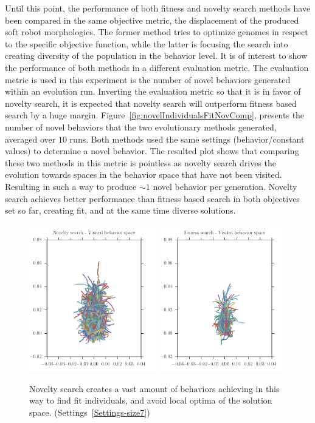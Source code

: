 Until this point, the performance of both fitness and novelty search methods have been compared in the same objective metric, the displacement of the produced soft robot morphologies. The former method tries to optimize genomes in respect to the specific objective function, while the latter is focusing the search into creating diversity of the population in the behavior level. It is of interest to show the performance of both methods in a different evaluation metric. The evaluation metric is used in this experiment is the number of novel behaviors generated within an evolution run. Inverting the evaluation metric so that it is in favor of novelty search, it is expected that novelty search will outperform fitness based search by a huge margin. Figure~\ref{fig:novelIndividualsFitNovComp}, presents the number of novel behaviors that the two evolutionary methods generated, averaged over $10$ runs. Both methods used the same settings (behavior/constant values) to determine a novel behavior. The resulted plot shows that comparing these two methods in this metric is pointless as novelty search drives the evolution towards spaces in the behavior space that have not been visited. Resulting in such a way to produce $\sim 1$ novel behavior per generation. Novelty search achieves better performance than fitness based search in both objectives set so far, creating fit, and at the same time diverse solutions.
\begin{figure}[t!]
\centering
\includegraphics[width=0.49\textwidth]{../Figures/Behaviors/behaviorsNovelty.pdf}\	
\includegraphics[width=0.49\textwidth]{../Figures/Behaviors/behaviorsFitness.pdf}
\caption{Novelty search creates a vast amount of behaviors achieving in this way to find fit individuals, and avoid local optima of the solution space. (Settings~\ref{Settings-size7})}
\label{fig:behaviorSpaceDiversity}
\end{figure}
